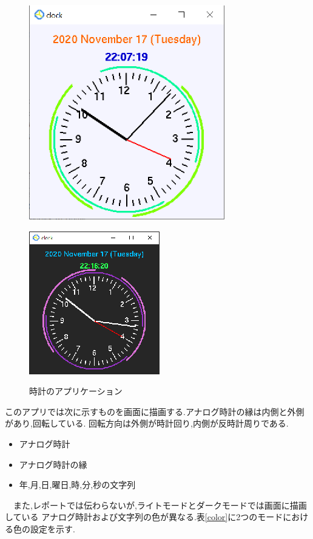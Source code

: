 \documentclass[a4j]{jarticle}
\begin{document}
        \begin{figure}[H]
          \begin{minipage}{0.5\hsize}
           \begin{center}
            \includegraphics[scale=1.2]{light.eps}
           \end{center}
           \label{light}
          \end{minipage}
          \begin{minipage}{0.5\hsize}
           \begin{center}
            \includegraphics[scale=1.8]{dark.eps}
           \end{center}
           \label{dark}
          \end{minipage}
          \caption{時計のアプリケーション}
          \label{clock}
         \end{figure}

         このアプリでは次に示すものを画面に描画する.アナログ時計の縁は内側と外側があり,回転している.
         回転方向は外側が時計回り,内側が反時計周りである.
         \begin{itemize}
          \item アナログ時計
          \item アナログ時計の縁
          \item 年,月,日,曜日,時,分,秒の文字列 
        \end{itemize}
         　また,レポートでは伝わらないが,ライトモードとダークモードでは画面に描画している
         アナログ時計および文字列の色が異なる.表\ref{color}に2つのモードにおける色の設定を示す.
\end{document}
